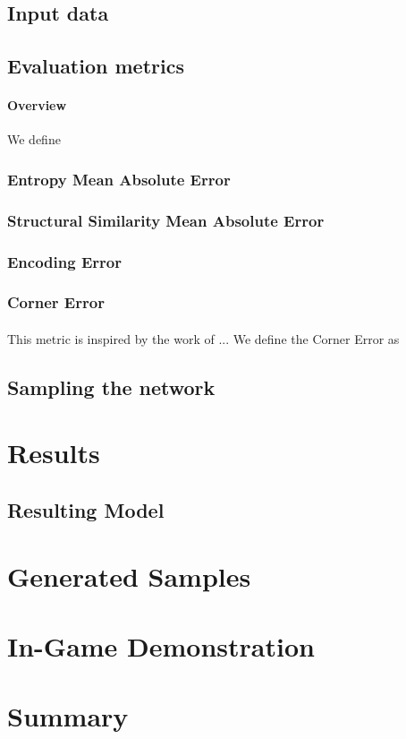 \subsection{Input data}
\label{sec:InputSelection}


\subsection{Evaluation metrics}
\label{sec:evaluation}
\paragraph{Overview} We define 
\subsubsection{Entropy Mean Absolute Error}
\subsubsection{Structural Similarity Mean Absolute Error}
\subsubsection{Encoding Error}
\subsubsection{Corner Error}
\paragraph{} This metric is inspired by the work of ...%
We define the Corner Error as


\subsection{Sampling the network}


\section{Results}
\label{sec:results}
\subsection{Resulting Model}
\label{sec:sampling}
\section{Generated Samples}
\section{In-Game Demonstration}
\section{Summary}
